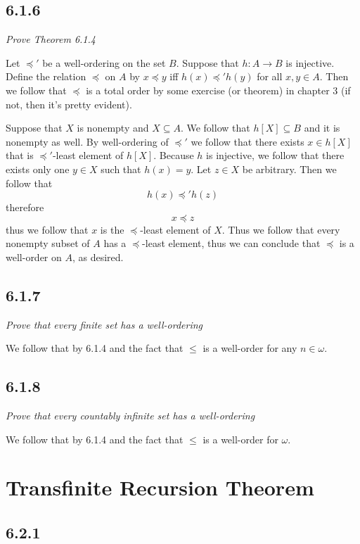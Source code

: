 \documentclass[11pt,oneside,titlepage]{book}
\begin{document}
\subsection*{6.1.6}

\textit{Prove Theorem 6.1.4}

Let $\preceq'$ be a well-ordering on the set $B$. Suppose that $h: A \to B$ is
injective. Define the relation $\preceq$ on $A$ by $x \preceq y$ iff $h(x) \preceq' h(y)$
for all $x, y \in A$. Then we follow that $\preceq$ is a total order by
some exercise (or theorem) in chapter 3 (if not, then it's pretty evident).

Suppose that $X$ is nonempty and $X \subseteq A$. We follow that
$h[X] \subseteq B$ and it is nonempty as well. By well-ordering of $\preceq'$ we follow that
there exists $x \in h[X]$ that is $\preceq'$-least element of $h[X]$. Because
$h$ is injective, we follow that there exists only one $y \in X$ such that
$h(x) = y$. Let $z \in X$ be arbitrary. Then we follow that
$$h(x) \preceq' h(z)$$
therefore
$$x \preceq z$$
thus we follow that $x$ is the $\preceq$-least element of $X$. Thus we follow that
every nonempty subset of $A$ has a $\preceq$-least element, thus we can conclude that
$\preceq$ is a well-order on $A$, as desired.

\subsection*{6.1.7}

\textit{Prove that every finite set has a well-ordering}

We follow that by 6.1.4 and the fact that $\leq$ is a well-order
for any $n \in \omega$.

\subsection*{6.1.8}

\textit{Prove that every countably infinite set has a well-ordering}

We follow that by 6.1.4 and the fact that $\leq$ is a well-order
for $\omega$.

\section{Transfinite Recursion Theorem}

\subsection*{6.2.1}
\end{document}

